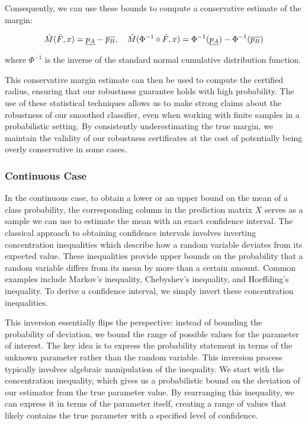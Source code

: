 Consequently, we can use these bounds to compute a conservative estimate of the margin:

\begin{equation}
    \Hat{M}(\Hat{F},x)= \underline{p_A} - \overline{p_B}, \quad\tilde{M}(\Phi^{-1}\circ\Hat{F},x) = \Phi^{-1}(\underline{p_A}) - \Phi^{-1}(\overline{p_B})
\end{equation}

where $\Phi^{-1}$ is the inverse of the standard normal cumulative distribution function.

This conservative margin estimate can then be used to compute the certified radius, ensuring that our robustness guarantee holds with high probability.
The use of these statistical techniques allows us to make strong claims about the robustness of our smoothed classifier, even when working with finite samples in a probabilistic setting.
By consistently underestimating the true margin, we maintain the validity of our robustness certificates at the cost of potentially being overly conservative in some cases.

\subsubsection{Continuous Case}\label{subsubsec:continuous-case}
In the continuous case, to obtain a lower or an upper bound on the mean of a class probability, the corresponding column in the prediction matrix $X$ serves as a sample we can use to estimate the mean with an exact confidence interval.
The classical approach to obtaining confidence intervals involves inverting concentration inequalities which describe how a random variable deviates from its expected value.
These inequalities provide upper bounds on the probability that a random variable differs from its mean by more than a certain amount.
Common examples include Markov's inequality, Chebyshev's inequality, and Hoeffding's inequality.
To derive a confidence interval, we simply invert these concentration inequalities.

This inversion essentially flips the perspective: instead of bounding the probability of deviation, we bound the range of possible values for the parameter of interest.
The key idea is to express the probability statement in terms of the unknown parameter rather than the random variable.
This inversion process typically involves algebraic manipulation of the inequality.
We start with the concentration inequality, which gives us a probabilistic bound on the deviation of our estimator from the true parameter value.
By rearranging this inequality, we can express it in terms of the parameter itself, creating a range of values that likely contains the true parameter with a specified level of confidence.

